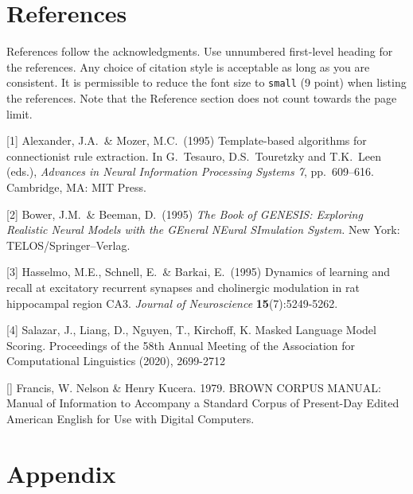 \documentclass{article}
\begin{document}
\section*{References}

References follow the acknowledgments. Use unnumbered first-level heading for
the references. Any choice of citation style is acceptable as long as you are
consistent. It is permissible to reduce the font size to \verb+small+ (9 point)
when listing the references.
Note that the Reference section does not count towards the page limit.
\medskip

{
\small

[1] Alexander, J.A.\ \& Mozer, M.C.\ (1995) Template-based algorithms for
connectionist rule extraction. In G.\ Tesauro, D.S.\ Touretzky and T.K.\ Leen
(eds.), {\it Advances in Neural Information Processing Systems 7},
pp.\ 609--616. Cambridge, MA: MIT Press.

[2] Bower, J.M.\ \& Beeman, D.\ (1995) {\it The Book of GENESIS: Exploring
  Realistic Neural Models with the GEneral NEural SImulation System.}  New York:
TELOS/Springer--Verlag.

[3] Hasselmo, M.E., Schnell, E.\ \& Barkai, E.\ (1995) Dynamics of learning and
recall at excitatory recurrent synapses and cholinergic modulation in rat
hippocampal region CA3. {\it Journal of Neuroscience} {\bf 15}(7):5249-5262.

[4] Salazar, J., Liang, D., Nguyen, T., Kirchoff, K. Masked Language Model Scoring. Proceedings of the 58th Annual Meeting of the Association for Computational Linguistics (2020), 2699-2712

[] Francis, W. Nelson \& Henry Kucera. 1979. BROWN CORPUS MANUAL: Manual of Information to Accompany a Standard Corpus of Present-Day Edited American English for Use with Digital Computers.
}





\appendix

\section{Appendix}
\end{document}
